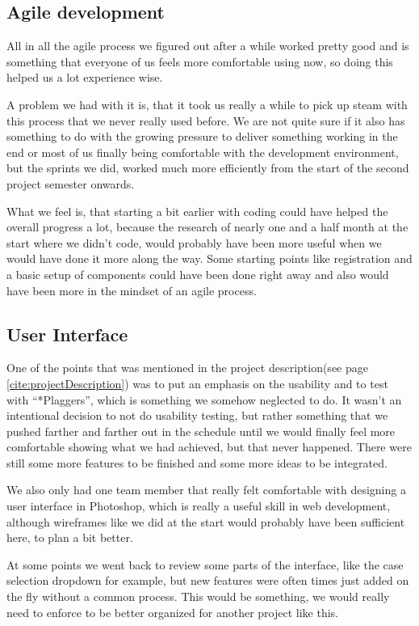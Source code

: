 \subsection{Agile development}

All in all the agile process we figured out after a while worked pretty good and is something that everyone of us feels more comfortable using now, so doing this helped us a lot experience wise. 

A problem we had with it is, that it took us really a while to pick up steam with this process that we never really used before. We are not quite sure if it also has something to do with the growing pressure to deliver something working in the end or most of us finally being comfortable with the development environment, but the sprints we did, worked much more efficiently from the start of the second project semester onwards.

What we feel is, that starting a bit earlier with coding could have helped the overall progress a lot, because the research of nearly one and a half month at the start where we didn't code, would probably have been more useful when we would have done it more along the way. Some starting points like registration and a basic setup of components could have been done right away and also would have been more in the mindset of an agile process.

\subsection{User Interface}

One of the points that was mentioned in the project description(see page \ref{cite:projectDescription}) was to put an emphasis on the usability and to test with \enquote{*Plaggers}, which is something we somehow neglected to do. It wasn't an intentional decision to not do usability testing, but rather something that we pushed farther and farther out in the schedule until we would finally feel more comfortable showing what we had achieved, but that never happened. There were still some more features to be finished and some more ideas to be integrated.

We also only had one team member that really felt comfortable with designing a user interface in Photoshop, which is really a useful skill in web development, although wireframes like we did at the start would probably have been sufficient here, to plan a bit better. 

At some points we went back to review some parts of the interface, like the case selection dropdown for example, but new features were often times just added on the fly without a common process. This would be something, we would really need to enforce to be better organized for another project like this.

